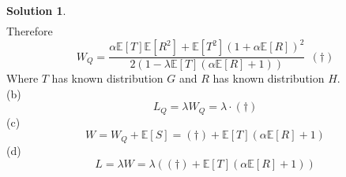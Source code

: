 \documentclass[a4paper, 10pt]{article}
\theoremstyle{definition}
\theoremstyle{hSol}
\newtheorem*{solution}{Solution}
\begin{document}
\begin{solution}
\begin{equation}
\begin{split}
  \end{split}
\end{equation}
Therefore
\begin{equation}
  W_Q = \frac{\alpha \mathbb{E}\left[T\right] \mathbb{E}\left[R^2\right] + \mathbb{E}\left[T^2\right]\left(1+\alpha \mathbb{E}\left[R\right]\right)^2}{2\left(1- \lambda\mathbb{E}\left[T\right]\left(\alpha \mathbb{E}\left[R\right]+1\right)\right)}~~(\dag)
\end{equation}
Where $T$ has known distribution $G$ and $R$ has known distribution $H$.\\
(b)
\begin{equation}
   L_Q = \lambda W_Q = \lambda\cdot(\dag)
 \end{equation} 
(c)
\begin{equation}
  W = W_Q + \mathbb{E}\left[S\right] = (\dag) + \mathbb{E}\left[T\right]\left(\alpha \mathbb{E}\left[R\right]+1\right)
\end{equation}
(d)
\begin{equation}
  L = \lambda W = \lambda \left((\dag)+\mathbb{E}\left[T\right]\left(\alpha \mathbb{E}\left[R\right]+1\right)\right)
\end{equation}
\end{solution}
\end{document}
